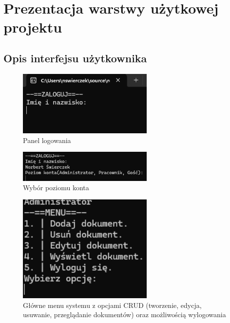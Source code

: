﻿%
\chapter{Prezentacja warstwy użytkowej projektu}

\section{Opis interfejsu użytkownika}

\begin{figure}[htbp]
  \centering
  \includegraphics[width=0.6\textwidth]{zalog.png}
  \caption{Panel logowania}
  \label{fig:zalog}
\end{figure}

\begin{figure}[htbp]
  \centering
  \includegraphics[width=0.6\textwidth]{zalog2.png}
  \caption{Wybór poziomu konta}
  \label{fig:zalog2}
\end{figure}

\begin{figure}[htbp]
  \centering
  \includegraphics[width=0.6\textwidth]{menu.png}
  \caption{Główne menu systemu z opcjami CRUD (tworzenie, edycja, usuwanie, przeglądanie dokumentów) oraz możliwością wylogowania}
  \label{fig:menu}
\end{figure}

